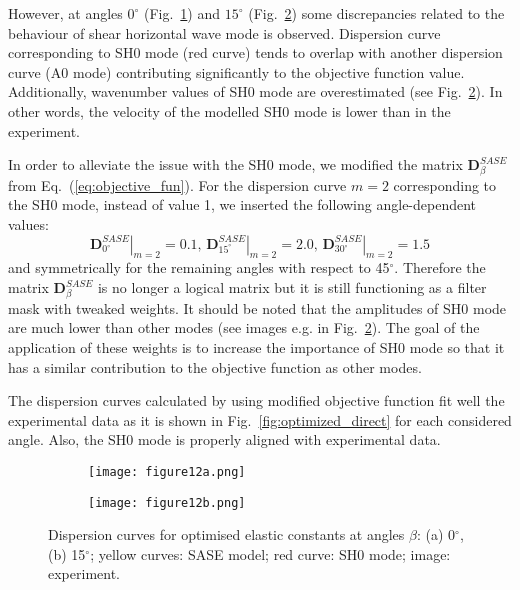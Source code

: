 \documentclass[preprint,12pt]{elsarticle}
\newcommand{\matr}[1]{\mathbf{#1}} %
\begin{document}
 However, at angles \(0^{\circ}\) (Fig.~\ref{fig:dispersion0deg_direct_SH0}) and \(15^{\circ}\) (Fig.~\ref{fig:dispersion15deg_direct_SH0}) some discrepancies related to the behaviour of shear horizontal wave mode is observed. Dispersion curve corresponding to SH0 mode (red curve) tends to overlap with another dispersion curve (A0 mode) contributing significantly to the objective function value. Additionally, wavenumber values of SH0 mode are overestimated (see Fig.~\ref{fig:dispersion15deg_direct_SH0}). In other words, the velocity of the modelled SH0 mode is lower than in the experiment.

In order to alleviate the issue with the SH0 mode, we modified the matrix 
\(\matr{D}^{SASE}_{\beta} \)  from Eq.~(\ref{eq:objective_fun}). 
For the dispersion curve \(m=2\) corresponding to the SH0 mode, instead of value 1, we inserted the following angle-dependent values:
\begin{equation}
\left. \matr{D}^{SASE}_{0^{\circ}}\right\vert_{m=2} = 0.1, \, \left. \matr{D}^{SASE}_{15^{\circ}}\right\vert_{m=2} = 2.0, \, \left. \matr{D}^{SASE}_{30^{\circ}}\right\vert_{m=2} = 1.5
\label{eq:objective_fun_mod}
\end{equation}	
and symmetrically for the remaining angles with respect to 45\(^{\circ}\). 
Therefore the matrix \(\matr{D}^{SASE}_{\beta} \) is no longer a logical matrix but it is still functioning as a filter mask with tweaked weights.
It should be noted that the amplitudes of SH0 mode are much lower than other modes (see images e.g. in Fig.~\ref{fig:dispersion15deg_direct_SH0}). 
The goal of the application of these weights is to increase the importance of SH0 mode so that it has a similar contribution to the objective function as other modes.

The dispersion curves calculated by using modified objective function fit well the experimental data as it is shown in Fig.~\ref{fig:optimized_direct} for each considered angle. 
Also, the SH0 mode is properly aligned with experimental data.

\begin{figure} [h!]
	\centering
	\begin{subfigure}[b]{\textwidth}
		\centering
		\texttt{[image: figure12a.png]}
		\caption{}
		\label{fig:dispersion0deg_direct_SH0}
	\end{subfigure}
	\begin{subfigure}[b]{\textwidth}
		\centering
		\texttt{[image: figure12b.png]}
		\caption{}
		\label{fig:dispersion15deg_direct_SH0}
	\end{subfigure}
	\caption{Dispersion curves for optimised elastic constants at angles \(\beta\): (a) 0\(^{\circ}\), (b) 15\(^{\circ}\); yellow curves: SASE model; red 
	curve: SH0 mode; image: experiment. }
	\label{fig:SH0_problem}
\end{figure}
\end{document}

